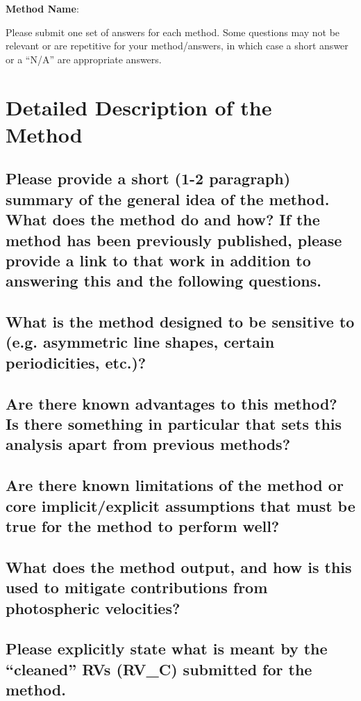 \documentclass[12pt]{article}
\numberwithin{equation}{section}
\begin{document}
\noindent
\textbf{Method Name}: \\
\hfill

\noindent
Please submit one set of answers for each method.  Some questions may not be relevant or are repetitive for your method/answers, in which case a short answer or a ``N/A'' are appropriate answers.

\section{Detailed Description of the Method}
\subsection{Please provide a short (1-2 paragraph) summary of the general idea of the method.  What does the method do and how?  If the method has been previously published, please provide a link to that work in addition to answering this and the following questions.}

\subsection{What is the method designed to be sensitive to (e.g. asymmetric line shapes, certain periodicities, etc.)?}

\subsection{Are there known advantages to this method?  Is there something in particular that sets this analysis apart from previous methods?}

\subsection{Are there known limitations of the method or core implicit/explicit assumptions that must be true for the method to perform well?}

\subsection{What does the method output, and how is this used to mitigate contributions from photospheric velocities?}

\subsection{Please explicitly state what is meant by the ``cleaned'' RVs (RV\_C) submitted for the method.}
\end{document}
